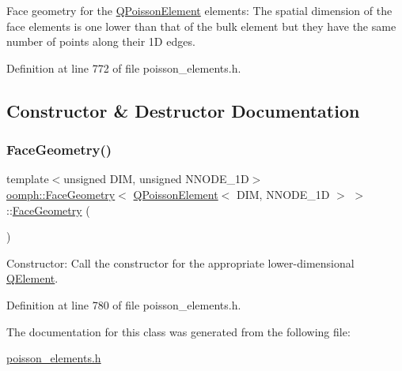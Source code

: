 Face geometry for the \hyperlink{classoomph_1_1QPoissonElement}{Q\+Poisson\+Element} elements\+: The spatial dimension of the face elements is one lower than that of the bulk element but they have the same number of points along their 1D edges. 

Definition at line 772 of file poisson\+\_\+elements.\+h.



\subsection{Constructor \& Destructor Documentation}
\mbox{\label{classoomph_1_1FaceGeometry_3_01QPoissonElement_3_01DIM_00_01NNODE__1D_01_4_01_4_a954702ded1d713906350fa118d8c9aa2}} 
\subsubsection{\texorpdfstring{Face\+Geometry()}{FaceGeometry()}}
{\footnotesize\ttfamily template$<$unsigned D\+IM, unsigned N\+N\+O\+D\+E\+\_\+1D$>$ \\
\hyperlink{classoomph_1_1FaceGeometry}{oomph\+::\+Face\+Geometry}$<$ \hyperlink{classoomph_1_1QPoissonElement}{Q\+Poisson\+Element}$<$ D\+IM, N\+N\+O\+D\+E\+\_\+1D $>$ $>$\+::\hyperlink{classoomph_1_1FaceGeometry}{Face\+Geometry} (\begin{DoxyParamCaption}{ }\end{DoxyParamCaption})\hspace{0.3cm}{\ttfamily [inline]}}



Constructor\+: Call the constructor for the appropriate lower-\/dimensional \hyperlink{classoomph_1_1QElement}{Q\+Element}. 



Definition at line 780 of file poisson\+\_\+elements.\+h.



The documentation for this class was generated from the following file\+:\begin{DoxyCompactItemize}
\item 
\hyperlink{poisson__elements_8h}{poisson\+\_\+elements.\+h}\end{DoxyCompactItemize}
